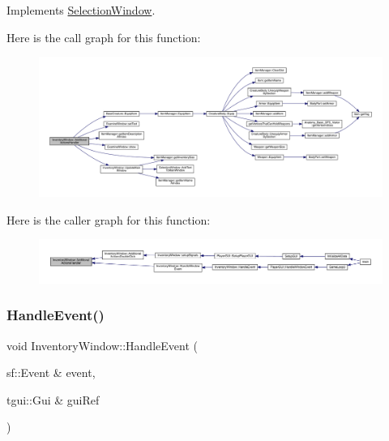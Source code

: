 Implements \mbox{\hyperlink{class_selection_window_aaa0131b5b67dc5b3f7ebb85835cd31a7}{Selection\+Window}}.

Here is the call graph for this function\+:
\nopagebreak
\begin{figure}[H]
\begin{center}
\leavevmode
\includegraphics[width=350pt]{d1/dee/class_inventory_window_a5115f00fecccca34ba3559079a325a9a_cgraph}
\end{center}
\end{figure}
Here is the caller graph for this function\+:
\nopagebreak
\begin{figure}[H]
\begin{center}
\leavevmode
\includegraphics[width=350pt]{d1/dee/class_inventory_window_a5115f00fecccca34ba3559079a325a9a_icgraph}
\end{center}
\end{figure}
\mbox{\label{class_inventory_window_ad023d9091385b9829673f6f592dd44ea}} 
\subsubsection{\texorpdfstring{Handle\+Event()}{HandleEvent()}}
{\footnotesize\ttfamily void Inventory\+Window\+::\+Handle\+Event (\begin{DoxyParamCaption}\item[{sf\+::\+Event \&}]{event,  }\item[{tgui\+::\+Gui \&}]{gui\+Ref }\end{DoxyParamCaption})\hspace{0.3cm}{\ttfamily [virtual]}}



